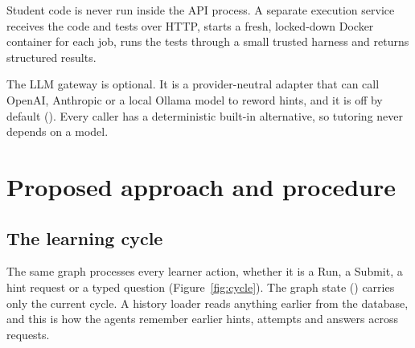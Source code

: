 Student code is never run inside the API process. A separate execution service receives the code and tests over HTTP, starts a fresh, locked-down Docker container for each job, runs the tests through a small trusted harness and returns structured results.

The LLM gateway is optional. It is a provider-neutral adapter that can call OpenAI, Anthropic or a local Ollama model to reword hints, and it is off by default (). Every caller has a deterministic built-in alternative, so tutoring never depends on a model.

\section{Proposed approach and procedure}

\subsection{The learning cycle}\label{sec:cycle}
The same graph processes every learner action, whether it is a Run, a Submit, a hint request or a typed question (Figure~\ref{fig:cycle}). The graph state () carries only the current cycle. A history loader reads anything earlier from the database, and this is how the agents remember earlier hints, attempts and answers across requests.

